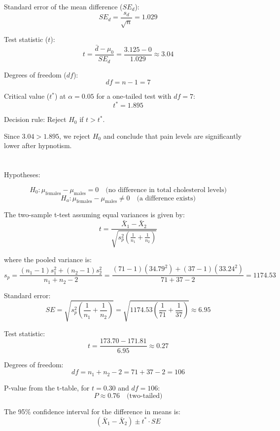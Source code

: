 \documentclass{homework}
\begin{document}
Standard error of the mean difference (\( SE_d \)):
\[
SE_d = \frac{s_d}{\sqrt{n}} = 1.029
\]

Test statistic (\( t \)):
\[
t = \frac{\bar{d} - \mu_0}{SE_d} = \frac{3.125 - 0}{1.029} \approx 3.04
\]

Degrees of freedom (\( df \)):
\[
df = n - 1 = 7
\]

Critical value (\( t^* \)) at \( \alpha = 0.05 \) for a one-tailed test with \( df = 7 \):
\[
t^* = 1.895
\]

Decision rule: Reject \( H_0 \) if \( t > t^* \).

Since \( 3.04 > 1.895 \), we reject \( H_0 \) and conclude that pain levels are significantly lower after hypnotism.

\section{}

\subsection{}

Hypotheses:

\[
H_0: \mu_{\text{females}} - \mu_{\text{males}} = 0 \quad \text{(no difference in total cholesterol levels)}
\]
\[
H_a: \mu_{\text{females}} - \mu_{\text{males}} \neq 0 \quad \text{(a difference exists)}
\]

The two-sample t-test assuming equal variances is given by:
\[
t = \frac{\bar{X}_1 - \bar{X}_2}{\sqrt{s_p^2 \left(\frac{1}{n_1} + \frac{1}{n_2}\right)}}
\]

where the pooled variance is:
\[
s_p = \frac{(n_1 - 1)s_1^2 + (n_2 - 1)s_2^2}{n_1 + n_2 - 2} = \frac{(71 - 1)(34.79^2) + (37 - 1)(33.24^2)}{71 + 37 - 2} = 1174.53
\]

Standard error:
\[
SE = \sqrt{s_p^2 \left(\frac{1}{n_1} + \frac{1}{n_2}\right)} = \sqrt{1174.53 \left(\frac{1}{71} + \frac{1}{37}\right)} \approx 6.95
\]

Test statistic:
\[
t = \frac{173.70 - 171.81}{6.95} \approx 0.27
\]

Degrees of freedom:
\[
df = n_1 + n_2 - 2 = 71 + 37 - 2 = 106
\]

P-value from the t-table, for \( t = 0.30 \) and \( df = 106 \):
\[
P \approx 0.76 \quad \text{(two-tailed)}
\]

The 95\% confidence interval for the difference in means is:
\[
(\bar{X}_1 - \bar{X}_2) \pm t^* \cdot SE
\]
\end{document}
